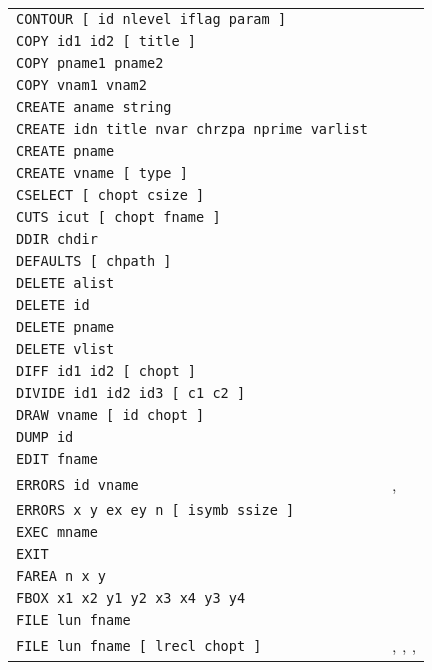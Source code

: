 \begin{longtable}{|>{\tt}ll|}
CONTOUR [ id nlevel iflag param ]  & \pageref{HISTOGRAMCONTOUR}\\ 
COPY id1 id2 [ title ]  & \pageref{HISTOGRAMCOPY}\\ 
COPY pname1 pname2 & \pageref{PICTURECOPY}\\ 
COPY vnam1 vnam2 & \pageref{VECTORCOPY}\\ 
CREATE aname string & \pageref{KUIPCREATE}\\ 
CREATE idn title nvar chrzpa nprime varlist & \pageref{NTUPLECREATE}\\ 
CREATE pname & \pageref{PICTURECREATE}\\ 
CREATE vname [ type ]  & \pageref{VECTORCREATE}\\ 
CSELECT [ chopt csize ]  & \pageref{NTUPLECSELECT}\\ 
CUTS icut [ chopt fname ]  & \pageref{NTUPLECUTS}\\ 
DDIR chdir & \pageref{ZEBRADDIR}\\ 
DEFAULTS [ chpath ]  & \pageref{MACRODEFAULTS}\\ 
DELETE alist & \pageref{KUIPDELETE}\\ 
DELETE id & \pageref{HISTOGRAMDELETE}\\ 
DELETE pname & \pageref{PICTUREDELETE}\\ 
DELETE vlist & \pageref{VECTORDELETE}\\ 
DIFF id1 id2 [ chopt ]  & \pageref{HISTOGRAMDIFF}\\ 
DIVIDE id1 id2 id3 [ c1 c2 ]  & \pageref{HISTOGRAMDIVIDE}\\ 
DRAW vname [ id chopt ]  & \pageref{VECTORDRAW}\\ 
DUMP id & \pageref{HISTOGRAMDUMP}\\ 
EDIT fname & \pageref{KUIPEDIT}\\ 
ERRORS id vname & \pageref{HISTOGRAMGERRORS}, \pageref{HISTOGRAMPERRORS}\\ 
ERRORS x y ex ey n [ isymb ssize ]  & \pageref{GRAPHICSERRORS}\\ 
EXEC mname & \pageref{MACROEXEC}\\ 
EXIT  & \pageref{KUIPEXIT}\\ 
FAREA n x y & \pageref{GRAPHICSFAREA}\\ 
FBOX x1 x2 y1 y2 x3 x4 y3 y4 & \pageref{GRAPHICSFBOX}\\ 
FILE lun fname & \pageref{FORTRANFILE}\\ 
FILE lun fname [ lrecl chopt ]  & \pageref{HISTOGRAMFILE}, \pageref{PICTUREFILE},
                                  \pageref{ZEBRAFFILE},    \pageref{ZEBRARFILE}\\ 

\end{longtable}
